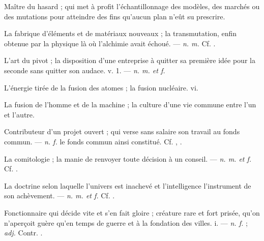  Maître du hasard ; qui met à profit l'échantillonnage des modèles, des marchés ou des mutations pour atteindre des fins qu'aucun plan n'eût su prescrire.

 La fabrique d'éléments et de matériaux nouveaux ; la transmutation, enfin obtenue par la physique là où l'alchimie avait échoué. ---  \textit{n. m.} Cf. .

 L'art du pivot ; la disposition d'une entreprise à quitter sa première idée pour la seconde sans quitter son audace.   v. 1. ---  \textit{n. m. et f.}

 L'énergie tirée de la fusion des atomes ; la fusion nucléaire.   vi.

 La fusion de l'homme et de la machine ; la culture d'une vie commune entre l'un et l'autre.

 Contributeur d'un projet ouvert ; qui verse sans salaire son travail au fonds commun. ---  \textit{n. f.} le fonds commun ainsi constitué. Cf. , .

 La comitologie ; la manie de renvoyer toute décision à un conseil. ---  \textit{n. m. et f.} Cf. .

 La doctrine selon laquelle l'univers est inachevé et l'intelligence l'instrument de son achèvement. ---  \textit{n. m. et f.} Cf. .

 Fonctionnaire qui décide vite et s'en fait gloire ; créature rare et fort prisée, qu'on n'aperçoit guère qu'en temps de guerre et à la fondation des villes.   i. ---  \textit{n. f.} ;  \textit{adj.} Contr. .

